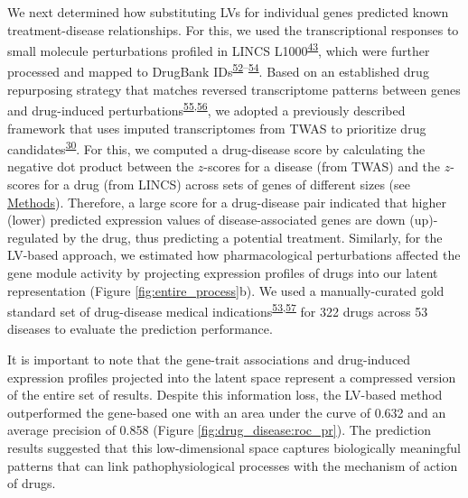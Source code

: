 \documentclass[
  a4paper,
]{article}
\begin{document}
We next determined how substituting LVs for individual genes predicted known treatment-disease relationships.
For this, we used the transcriptional responses to small molecule perturbations profiled in LINCS L1000\textsuperscript{\protect\hyperlink{ref-F7lIlh2N}{43}}, which were further processed and mapped to DrugBank IDs\textsuperscript{\protect\hyperlink{ref-6PR8LEXK}{52}--\protect\hyperlink{ref-1DJZvtwP1}{54}}.
Based on an established drug repurposing strategy that matches reversed transcriptome patterns between genes and drug-induced perturbations\textsuperscript{\protect\hyperlink{ref-1ClBKizD7}{55},\protect\hyperlink{ref-mZjkE1xU}{56}}, we adopted a previously described framework that uses imputed transcriptomes from TWAS to prioritize drug candidates\textsuperscript{\protect\hyperlink{ref-17oeJ0CXy}{30}}.
For this, we computed a drug-disease score by calculating the negative dot product between the \(z\)-scores for a disease (from TWAS) and the \(z\)-scores for a drug (from LINCS) across sets of genes of different sizes (see \protect\hyperlink{sec:methods:drug}{Methods}).
Therefore, a large score for a drug-disease pair indicated that higher (lower) predicted expression values of disease-associated genes are down (up)-regulated by the drug, thus predicting a potential treatment.
Similarly, for the LV-based approach, we estimated how pharmacological perturbations affected the gene module activity by projecting expression profiles of drugs into our latent representation (Figure \ref{fig:entire_process}b).
We used a manually-curated gold standard set of drug-disease medical indications\textsuperscript{\protect\hyperlink{ref-O21tn8vf}{53},\protect\hyperlink{ref-10KA5jTBQ}{57}} for 322 drugs across 53 diseases to evaluate the prediction performance.

It is important to note that the gene-trait associations and drug-induced expression profiles projected into the latent space represent a compressed version of the entire set of results.
Despite this information loss, the LV-based method outperformed the gene-based one with an area under the curve of 0.632 and an average precision of 0.858 (Figure \ref{fig:drug_disease:roc_pr}).
The prediction results suggested that this low-dimensional space captures biologically meaningful patterns that can link pathophysiological processes with the mechanism of action of drugs.
\end{document}
